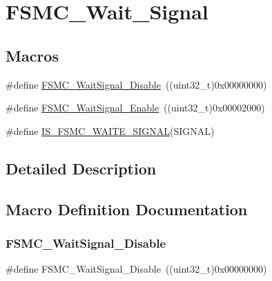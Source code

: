 \hypertarget{group___f_s_m_c___wait___signal}{}\section{F\+S\+M\+C\+\_\+\+Wait\+\_\+\+Signal}
\label{group___f_s_m_c___wait___signal}
\subsection*{Macros}
\begin{DoxyCompactItemize}
\item 
\#define \mbox{\hyperlink{group___f_s_m_c___wait___signal_ga6ea66c8ddee073281c421533bdff7e19}{F\+S\+M\+C\+\_\+\+Wait\+Signal\+\_\+\+Disable}}~((uint32\+\_\+t)0x00000000)
\item 
\#define \mbox{\hyperlink{group___f_s_m_c___wait___signal_gaf809e339f1cdc9d0a815fd98712e9ee3}{F\+S\+M\+C\+\_\+\+Wait\+Signal\+\_\+\+Enable}}~((uint32\+\_\+t)0x00002000)
\item 
\#define \mbox{\hyperlink{group___f_s_m_c___wait___signal_gae617db4f15c82850d4f5c927f9a7db3e}{I\+S\+\_\+\+F\+S\+M\+C\+\_\+\+W\+A\+I\+T\+E\+\_\+\+S\+I\+G\+N\+AL}}(S\+I\+G\+N\+AL)
\end{DoxyCompactItemize}


\subsection{Detailed Description}


\subsection{Macro Definition Documentation}
\mbox{\label{group___f_s_m_c___wait___signal_ga6ea66c8ddee073281c421533bdff7e19}} 
\subsubsection{\texorpdfstring{FSMC\_WaitSignal\_Disable}{FSMC\_WaitSignal\_Disable}}
{\footnotesize\ttfamily \#define F\+S\+M\+C\+\_\+\+Wait\+Signal\+\_\+\+Disable~((uint32\+\_\+t)0x00000000)}

\mbox{\label{group___f_s_m_c___wait___signal_gaf809e339f1cdc9d0a815fd98712e9ee3}} 

